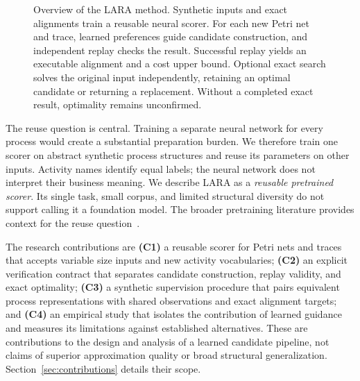 \begin{figure}[!t]
\centering

\caption{Overview of the LARA method. Synthetic inputs and exact alignments train a reusable neural scorer. For each new Petri net and trace, learned preferences guide candidate construction, and independent replay checks the result. Successful replay yields an executable alignment and a cost upper bound. Optional exact search solves the original input independently, retaining an optimal candidate or returning a replacement. Without a completed exact result, optimality remains unconfirmed.}
\label{fig:outline}
\end{figure}

\begin{revised}The reuse question is central. Training a separate neural network for every process would create a substantial preparation burden. We therefore train one scorer on abstract synthetic process structures and reuse its parameters on other inputs. Activity names identify equal labels; the neural network does not interpret their business meaning. We describe LARA as a \emph{reusable pretrained scorer}. Its single task, small corpus, and limited structural diversity do not support calling it a foundation model. The broader pretraining literature provides context for the reuse question~\cite{Bommasani2021,Rizk2024}.\end{revised}

\begin{revised}The research contributions are \textbf{(C1)} a reusable scorer for Petri nets and traces that accepts variable size inputs and new activity vocabularies; \textbf{(C2)} an explicit verification contract that separates candidate construction, replay validity, and exact optimality; \textbf{(C3)} a synthetic supervision procedure that pairs equivalent process representations with shared observations and exact alignment targets; and \textbf{(C4)} an empirical study that isolates the contribution of learned guidance and measures its limitations against established alternatives. These are contributions to the design and analysis of a learned candidate pipeline, not claims of superior approximation quality or broad structural generalization. Section~\ref{sec:contributions} details their scope.\end{revised}

